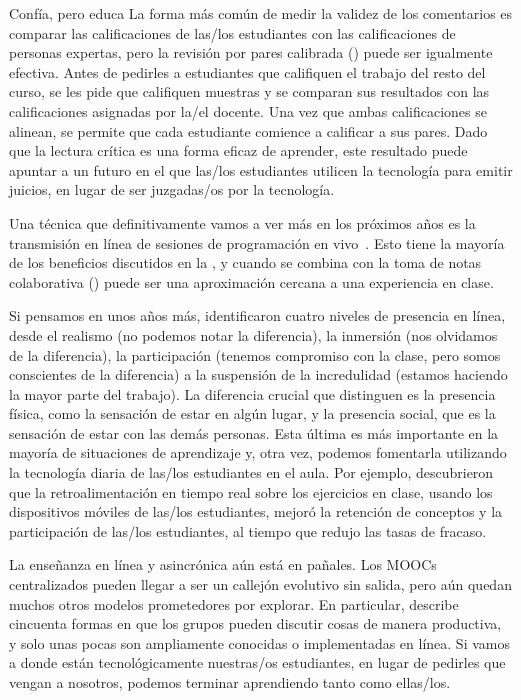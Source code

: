 \begin{aside}{Confía, pero educa}
  La forma más común de medir la validez de los comentarios
  es comparar las calificaciones de las/los estudiantes con las calificaciones de personas expertas,
  pero la revisión por pares calibrada () puede ser igualmente efectiva.
  Antes de pedirles a estudiantes que califiquen el trabajo del resto del curso,
  se les pide que califiquen muestras y se comparan sus resultados con las calificaciones asignadas por la/el docente.
  Una vez que ambas calificaciones se alinean,
  se permite que cada estudiante comience a calificar a sus pares.
  Dado que la lectura crítica es una forma eficaz de aprender,
  este resultado puede apuntar a un futuro en el que las/los estudiantes utilicen la tecnología para emitir juicios,
  en lugar de ser juzgadas/os por la tecnología.
\end{aside}

Una técnica que definitivamente vamos a ver más en los próximos años es
la transmisión en línea de sesiones de programación en vivo~\cite{Raj2018,Haar2017}.
Esto tiene la mayoría de los beneficios discutidos en la ,
y cuando se combina con la toma de notas colaborativa ()
puede ser una aproximación cercana a una experiencia en clase.

Si pensamos en unos años más,
\cite{Ijss2000} identificaron cuatro niveles de presencia en línea,
desde el realismo (no podemos notar la diferencia),
la inmersión (nos olvidamos de la diferencia),
la participación (tenemos compromiso con la clase, pero somos conscientes de la diferencia)
a la suspensión de la incredulidad (estamos haciendo la mayor parte del trabajo).
La diferencia crucial que distinguen es
la presencia física, como
la sensación de estar en algún lugar,
y la presencia social, que es la sensación de estar con las demás personas.
Esta última es más importante en la mayoría de situaciones de aprendizaje
y, otra vez,
podemos fomentarla utilizando la tecnología diaria de las/los estudiantes en el aula.
Por ejemplo,
\cite{Deb2018} descubrieron que la retroalimentación en tiempo real sobre los ejercicios en clase,
usando los dispositivos móviles de las/los estudiantes, mejoró la retención de conceptos y
la participación de las/los estudiantes, al tiempo que redujo las tasas de fracaso.

La enseñanza en línea y asincrónica aún está en pañales.
Los MOOCs centralizados pueden llegar a ser un callejón evolutivo sin salida,
pero aún quedan muchos otros modelos prometedores por explorar.
En particular,
\cite{Broo2016} describe cincuenta formas en que los grupos pueden discutir cosas de manera productiva,
y solo unas pocas son ampliamente conocidas o implementadas en línea.
Si vamos a donde están tecnológicamente nuestras/os estudiantes,
en lugar de pedirles que vengan a nosotros,
podemos terminar aprendiendo tanto como ellas/los.

